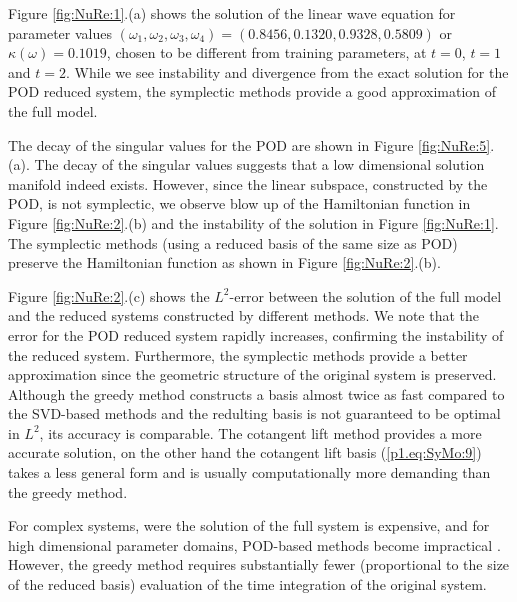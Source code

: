 Figure \ref{fig:NuRe:1}.(a) shows the solution of the linear wave equation for parameter values $(\omega_1,\omega_2,\omega_3,\omega_4) = (0.8456,0.1320,0.9328,0.5809)$ or $\kappa(\omega) = 0.1019$, chosen to be different from training parameters, at $t=0$, $t = 1$ and $t=2$. While we see instability and divergence from the exact solution for the POD reduced system, the symplectic methods provide a good approximation of the full model. 

The decay of the singular values for the POD are shown in Figure \ref{fig:NuRe:5}.(a). The decay of the singular values suggests that a low dimensional solution manifold indeed exists. However, since the linear subspace, constructed by the POD, is not symplectic, we observe blow up of the Hamiltonian function in Figure \ref{fig:NuRe:2}.(b) and the instability of the solution in Figure \ref{fig:NuRe:1}. The symplectic methods (using a reduced basis of the same size as POD) preserve the Hamiltonian function as shown in Figure \ref{fig:NuRe:2}.(b).

Figure \ref{fig:NuRe:2}.(c) shows the $L^2$-error between the solution of the full model and the reduced systems constructed by different methods. We note that the error for the POD reduced system rapidly increases, confirming the instability of the reduced system. Furthermore, the symplectic methods provide a better approximation since the geometric structure of the original system is preserved. Although the greedy method constructs a basis almost twice as fast compared to the SVD-based methods and the redulting basis is not guaranteed to be optimal in $L^2$, its accuracy is comparable. The cotangent lift method provides a more accurate solution, on the other hand the cotangent lift basis (\ref{p1.eq:SyMo:9}) takes a less general form and is usually computationally more demanding than the greedy method.

For complex systems, were the solution of the full system is expensive, and for high dimensional parameter domains, POD-based methods become impractical \cite{hesthaven2015certified,quarteroni2015reduced}. However, the greedy method requires substantially fewer (proportional to the size of the reduced basis) evaluation of the time integration of the original system.

